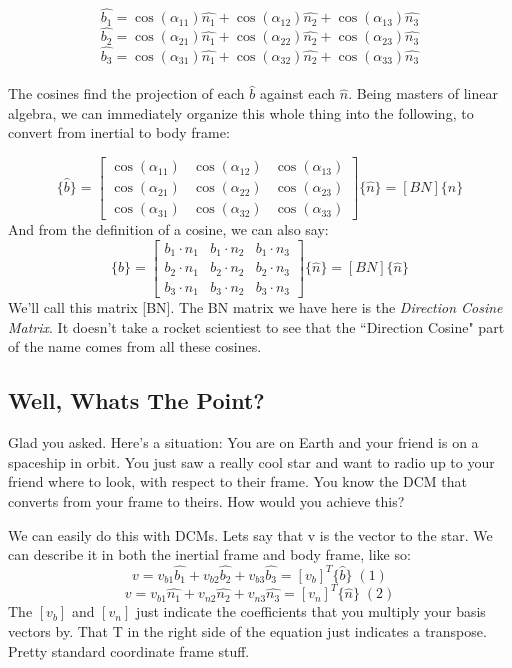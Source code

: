 \documentclass[a4paper,14pt]{extreport}
\newcommand{\bv}[1]{\hat{b_{#1}}}
\newcommand{\nv}[1]{\hat{n_{#1}}}
\begin{document}
\[\bv{1} = \cos(\alpha_{11})\nv{1} + \cos(\alpha_{12})\nv{2} + \cos(\alpha_{13})\nv{3}\]
\[\bv{2} = \cos(\alpha_{21})\nv{1} + \cos(\alpha_{22})\nv{2} + \cos(\alpha_{23})\nv{3}\]
\[\bv{3} = \cos(\alpha_{31})\nv{1} + \cos(\alpha_{32})\nv{2} + \cos(\alpha_{33})\nv{3}\]
\\
The cosines find the projection of each $\hat{b}$ against each $\hat{n}$. Being masters of linear algebra, we can immediately organize this whole thing into the following, to convert from inertial to body frame:

\[
\{\hat{b}\} = \begin{bmatrix}
\cos(\alpha_{11})&\cos(\alpha_{12})&\cos(\alpha_{13}) \\
\cos(\alpha_{21})&\cos(\alpha_{22})&\cos(\alpha_{23}) \\
\cos(\alpha_{31})&\cos(\alpha_{32})&\cos(\alpha_{33})
\end{bmatrix} \{\hat{n}\} = [BN] \{\hat{n}\}
\]
And from the definition of a cosine, we can also say:
\[
\{\hat{b}\} = \begin{bmatrix}
b_1 \cdot n_1 & b_1 \cdot n_2 & b_1 \cdot n_3 \\
b_2 \cdot n_1 & b_2 \cdot n_2 & b_2 \cdot n_3 \\
b_3 \cdot n_1 & b_3 \cdot n_2 & b_3 \cdot n_3
\end{bmatrix} \{\hat{n}\} = [BN] \{\hat{n}\}
\]
We'll call this matrix [BN]. The BN matrix we have here is the \emph{Direction Cosine Matrix}. It doesn't take a rocket scientiest to see that the ``Direction Cosine" part of the name comes from all these cosines.

\subsection{Well, Whats The Point?}
Glad you asked. Here's a situation: You are on Earth and your friend is on a spaceship in orbit. You just saw a really cool star and want to radio up to your friend where to look, with respect to their frame. You know the DCM that converts from your frame to theirs. How would you achieve this?

We can easily do this with DCMs. Lets say that v is the vector to the star. We can describe it in both the inertial frame and body frame, like so:
\[v = v_{b1}\bv{1}+v_{b2}\bv{2}+v_{b3}\bv{3}=[v_b]^T\{\hat{b}\}\;(1)\]
\[v = v_{b1}\nv{1}+v_{n2}\nv{2}+v_{n3}\nv{3}=[v_n]^T\{\hat{n}\}\;(2)\]
The $[v_b]$ and $[v_n]$ just indicate the coefficients that you multiply your basis vectors by. That T in the right side of the equation just indicates a transpose. Pretty standard coordinate frame stuff. 
\end{document}
